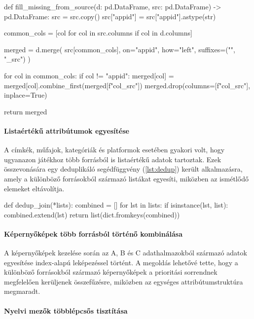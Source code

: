 \begin{python}[caption={Hiányzó adatok pótlása},captionpos=b,label={lst:missing}]
def fill_missing_from_source(d: pd.DataFrame,
                             src: pd.DataFrame) -> pd.DataFrame:
    src = src.copy()
    src["appid"] = src["appid"].astype(str)

    common_cols = [col for col in src.columns if col in d.columns]

    merged = d.merge(
        src[common_cols],
        on="appid",
        how="left",
        suffixes=("", "_src")
    )

    for col in common_cols:
        if col != "appid":
            merged[col] = merged[col].combine_first(merged[f"{col}_src"])
            merged.drop(columns=[f"{col}_src"], inplace=True)

    return merged
\end{python}

\paragraph{Listaértékű attribútumok egyesítése}

A címkék, műfajok, kategóriák és platformok esetében gyakori volt, hogy ugyanazon játékhoz több forrásból is listaértékű adatok tartoztak. Ezek összevonására egy deduplikáló segédfüggvény (\ref{lst:dedup}) került alkalmazásra, amely a különböző forrásokból származó listákat egyesíti, miközben az ismétlődő elemeket eltávolítja.

\begin{python}[caption={Deduplikáló segédfüggvény},captionpos=b,label={lst:dedup}]
def dedup_join(*lists):
    combined = []
    for lst in lists:
        if isinstance(lst, list):
            combined.extend(lst)
    return list(dict.fromkeys(combined))
\end{python}

\paragraph{Képernyőképek több forrásból történő kombinálása}

A képernyőképek kezelése során az A, B és C adathalmazokból származó adatok egyesítése index-alapú leképezéssel történt. A megoldás lehetővé tette, hogy a különböző forrásokból származó képernyőképek a prioritási sorrendnek megfelelően kerüljenek összefűzésre, miközben az egységes attribútumstruktúra megmaradt.

\paragraph{Nyelvi mezők többlépcsős tisztítása}

